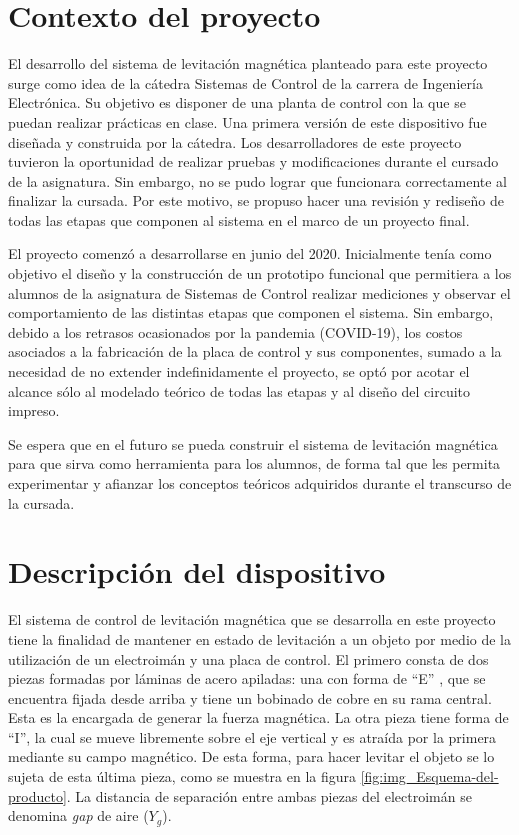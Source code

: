 \section{Contexto del proyecto}

El desarrollo del sistema de levitación magnética planteado para este proyecto surge como idea de la cátedra Sistemas de Control de la carrera de Ingeniería Electrónica. Su objetivo es disponer de una planta de control con la  que se puedan realizar prácticas en clase. Una primera versión de este dispositivo fue diseñada y construida por la cátedra. Los desarrolladores de este proyecto tuvieron la oportunidad de realizar pruebas y modificaciones durante el cursado de la asignatura. Sin embargo, no se pudo lograr que funcionara correctamente al finalizar la cursada. Por este motivo, se propuso hacer una revisión y rediseño de todas las etapas que componen al sistema en el marco de un proyecto final.

El proyecto comenzó a desarrollarse en junio del 2020. Inicialmente tenía como objetivo el diseño y la construcción de un prototipo funcional que permitiera a los alumnos de la asignatura de Sistemas de Control realizar mediciones y observar el comportamiento de las distintas etapas que componen el sistema. Sin embargo, debido a los retrasos ocasionados por la pandemia (COVID-19), los costos asociados a la fabricación de la placa de control y sus componentes, sumado a la  necesidad de no extender indefinidamente el proyecto, se optó por acotar el alcance sólo al modelado teórico de todas las etapas y al diseño del circuito impreso.

Se espera que en el futuro se pueda construir el sistema de levitación magnética para que sirva como herramienta para los alumnos, de forma tal que les permita experimentar y afianzar los conceptos teóricos adquiridos durante el transcurso de la cursada.


\section{Descripción del dispositivo}
El sistema de control de levitación magnética que se desarrolla en este proyecto tiene la finalidad de mantener en estado de levitación a un objeto por medio de la utilización de un electroimán y una placa de control. El primero consta de dos piezas formadas por láminas de acero apiladas: una con forma de “E” , que se encuentra fijada desde arriba y tiene un bobinado de cobre en su rama central. Esta es la encargada de generar la fuerza magnética. La otra pieza tiene forma de “I”, la cual se mueve libremente sobre el eje vertical y es atraída por la primera mediante su campo magnético. De esta forma, para hacer levitar el objeto se lo sujeta de esta última pieza, como se muestra en la figura \ref{fig:img_Esquema-del-producto}. La distancia de separación entre ambas piezas del electroimán se denomina  \textsl{gap} de aire ($Y_{g}$).

